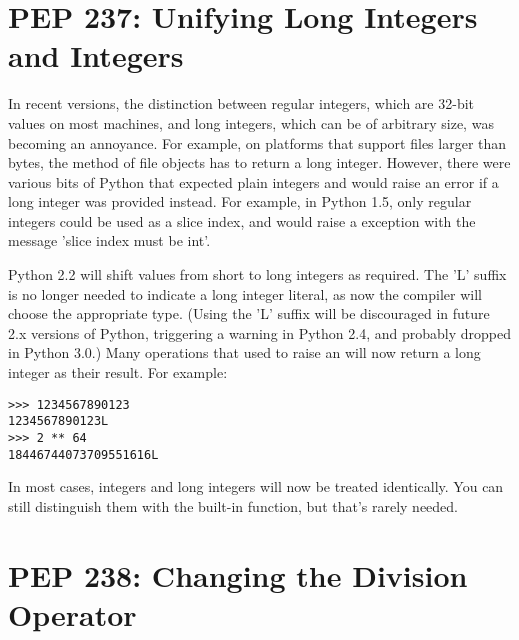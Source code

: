 \documentclass{howto}
\begin{document}
\section{PEP 237: Unifying Long Integers and Integers}

In recent versions, the distinction between regular integers, which
are 32-bit values on most machines, and long integers, which can be of
arbitrary size, was becoming an annoyance.  For example, on platforms
that support files larger than  bytes, the
 method of file objects has to return a long integer.
However, there were various bits of Python that expected plain
integers and would raise an error if a long integer was provided
instead.  For example, in Python 1.5, only regular integers
could be used as a slice index, and  would raise a
 exception with the message 'slice index must be
int'.

Python 2.2 will shift values from short to long integers as required.
The 'L' suffix is no longer needed to indicate a long integer literal,
as now the compiler will choose the appropriate type.  (Using the 'L'
suffix will be discouraged in future 2.x versions of Python,
triggering a warning in Python 2.4, and probably dropped in Python
3.0.)  Many operations that used to raise an 
will now return a long integer as their result.  For example:

\begin{verbatim}
>>> 1234567890123
1234567890123L
>>> 2 ** 64
18446744073709551616L
\end{verbatim}

In most cases, integers and long integers will now be treated
identically.  You can still distinguish them with the
 built-in function, but that's rarely needed.  

\begin{seealso}


\end{seealso}


\section{PEP 238: Changing the Division Operator}
\end{document}
